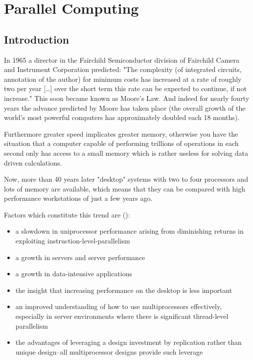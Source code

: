 \chapter{Parallel Computing}
\section{Introduction}

In 1965 a director in the Fairchild Semiconductor division of
Fairchild Camera and Instrument Corporation predicted: "The complexity
(of integrated circuits, annotation of the author)
for minimum costs has increased at a rate of roughly two per year
[\ldots] over the short term this rate can be expected to continue, if
not increase." \cite{moore} This soon became known as Moore's Law. And
indeed for nearly fourty years the advance predicted by Moore has
taken place (the overall growth of the world's most powerful computers
has approximately doubled each 18 months).

Furthermore greater speed implicates greater memory, otherwise you have
the situation that a computer capable of performing trillions of
operations in each second only has access to a small memory which is
rather useless for solving data driven calculations.

Now, more than 40 years later "desktop" systems with two to four
processors and lots of memory are available, which means that they can
be compared with high performance workstations of just a few years
ago.

Factors which constitute this trend are (\cite{architecture}):
\begin{itemize}
\item a slowdown in uniprocessor performance arising from  diminishing
  returns in exploiting instruction-level-parallelism
\item a growth in servers and server performance
\item a growth in data-intensive applications
\item the insight that increasing performance on the desktop is less
  important
\item an improved understanding of how to use multiprocessors
  effectively, especially in server environments where there is
  significant thread-level parallelism
\item the advantages of leveraging a design investment by replication
  rather than unique design--all multiprocessor designs provide such leverage
\end{itemize}

